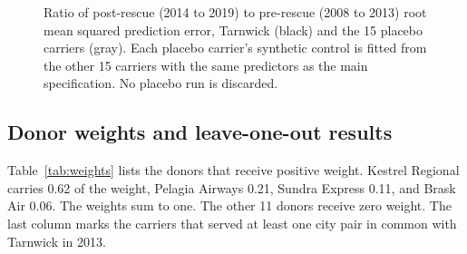 \documentclass[12pt]{article}
\begin{document}
\begin{figure}[ht]
\centering
{}
\caption{Ratio of post-rescue (2014 to 2019) to pre-rescue (2008 to 2013) root mean squared prediction error, Tarnwick (black) and the 15 placebo carriers (gray). Each placebo carrier's synthetic control is fitted from the other 15 carriers with the same predictors as the main specification. No placebo run is discarded.}
\label{fig:ratio}
\end{figure}

\subsection{Donor weights and leave-one-out results}

Table~\ref{tab:weights} lists the donors that receive positive weight. Kestrel Regional carries 0.62 of the weight, Pelagia Airways 0.21, Sundra Express 0.11, and Brask Air 0.06. The weights sum to one. The other 11 donors receive zero weight. The last column marks the carriers that served at least one city pair in common with Tarnwick in 2013.
\end{document}
